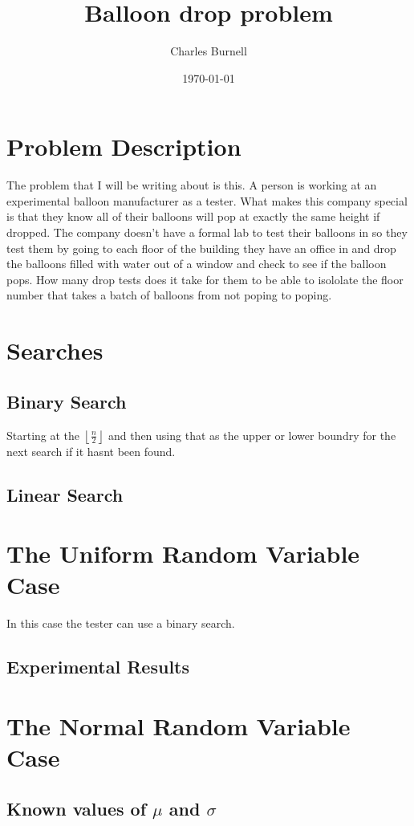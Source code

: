 \documentclass{article}
\title{Balloon drop problem}
\author{Charles Burnell}
\date{\today}
\providecommand{\myfloor}[1]{\left \lfloor #1 \right \rfloor }
\begin{document}
\maketitle
\section*{Problem Description}
The problem that I will be writing about is this. A person is working at an experimental balloon manufacturer as a tester. What makes this company special is that they know all of their balloons will pop at exactly the same height if dropped. The company doesn't have a formal lab to test their balloons in so they test them by going to each floor of the building they have an office in and drop the balloons filled with water out of a window and check to see if the balloon pops. How many drop tests does it take for them to be able to isololate the floor number that takes a batch of balloons from not poping to poping.\\

\section*{Searches}

\subsection*{Binary Search}
Starting at the $\myfloor{\frac{n}{2}}$ and then using that as the upper or lower boundry for the next search if it hasnt been found.

\subsection*{Linear Search}

\section*{The Uniform Random Variable Case}
In this case the tester can use a binary search. \subsection*{Experimental Results}

\section*{The Normal Random Variable Case}
\subsection*{Known values of $\mu$ and $\sigma$}
\end{document}
